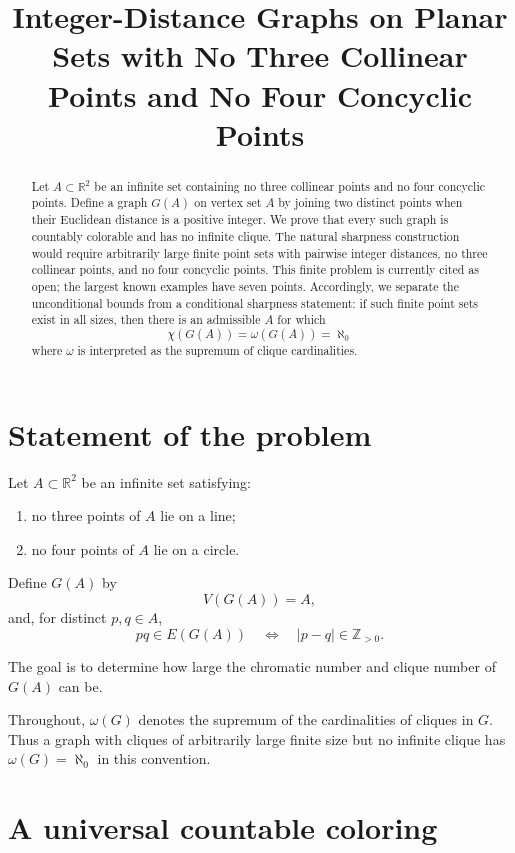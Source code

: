 \documentclass[11pt]{article}
\title{Integer-Distance Graphs on Planar Sets with No Three Collinear Points and No Four Concyclic Points}
\author{}
\date{}
\newcommand{\R}{\mathbb R}
\newcommand{\Z}{\mathbb Z}
\begin{document}
\maketitle

\begin{abstract}
Let \(A\subset \R^2\) be an infinite set containing no three collinear points and no four concyclic points. Define a graph \(G(A)\) on vertex set \(A\) by joining two distinct points when their Euclidean distance is a positive integer. We prove that every such graph is countably colorable and has no infinite clique. The natural sharpness construction would require arbitrarily large finite point sets with pairwise integer distances, no three collinear points, and no four concyclic points. This finite problem is currently cited as open; the largest known examples have seven points. Accordingly, we separate the unconditional bounds from a conditional sharpness statement: if such finite point sets exist in all sizes, then there is an admissible \(A\) for which
\[
\chi(G(A))=\omega(G(A))=\aleph_0
\]
where \(\omega\) is interpreted as the supremum of clique cardinalities.
\end{abstract}

\section{Statement of the problem}

Let \(A\subset \R^2\) be an infinite set satisfying:

\begin{enumerate}
    \item no three points of \(A\) lie on a line;
    \item no four points of \(A\) lie on a circle.
\end{enumerate}

Define \(G(A)\) by
\[
V(G(A))=A,
\]
and, for distinct \(p,q\in A\),
\[
pq\in E(G(A))
\quad\Longleftrightarrow\quad
|p-q|\in \Z_{>0}.
\]

The goal is to determine how large the chromatic number and clique number of \(G(A)\) can be.

Throughout, \(\omega(G)\) denotes the supremum of the cardinalities of cliques in \(G\). Thus a graph with cliques of arbitrarily large finite size but no infinite clique has \(\omega(G)=\aleph_0\) in this convention.

\section{A universal countable coloring}
\end{document}
